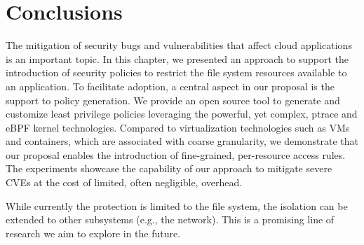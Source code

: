 \section{Conclusions}
\label{dmng:sect:conclusions}

The mitigation of security bugs and vulnerabilities that affect cloud
applications is an important topic. In this chapter, we presented an
approach to support the introduction of security policies to restrict
the file system resources available to an application. To facilitate
adoption, a central aspect in our proposal is the support to policy
generation. We provide an open source tool to generate and customize
least privilege policies leveraging the powerful, yet complex, ptrace
and eBPF kernel technologies.  Compared to virtualization technologies
such as VMs and containers, which are associated with coarse
granularity, we demonstrate that our proposal enables the introduction
of fine-grained, per-resource access rules. The experiments showcase
the capability of our approach to mitigate severe CVEs at the cost of
limited, often negligible, overhead.

While currently the protection is limited to the file system, the
isolation can be extended to other subsystems (e.g., the network).
This is a promising line of research we aim to explore in the future.

